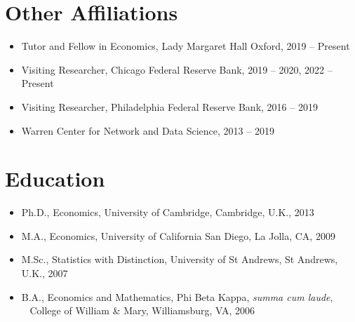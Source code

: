 \documentclass[line,overlapped]{myres}
\begin{document}
\begin{resume}
\section{\sc Other Affiliations}
\begin{itemize}
\item Tutor and Fellow in Economics, Lady Margaret Hall Oxford, 2019 -- Present
\item Visiting Researcher, Chicago Federal Reserve Bank, 2019 -- 2020, 2022 -- Present
\item Visiting Researcher, Philadelphia Federal Reserve Bank, 2016 -- 2019
\item Warren Center for Network and Data Science, 2013 -- 2019 
\end{itemize}

\section{\sc Education}
\begin{itemize}
\item Ph.D., Economics, University of Cambridge, Cambridge, U.K., 2013
\item M.A., Economics, University of California San Diego, La Jolla, CA, 2009
\item M.Sc., Statistics with Distinction, University of St Andrews, St Andrews, U.K., 2007
\item B.A., Economics and Mathematics, Phi Beta Kappa, \emph{summa cum laude},\\ 
  \-\ \hspace{1em} College of William \& Mary, Williamsburg, VA, 2006
\end{itemize}





\end{resume}
\end{document}
